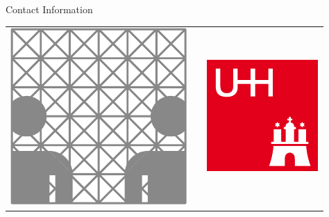 \documentclass[final]{beamer}
\newlength{\onecolwid}
\newlength{\twocolwid}
\begin{document}
\begin{frame}[t]
\begin{columns}[t]
\begin{column}{\twocolwid}
\begin{columns}[t,totalwidth=\twocolwid]
\begin{column}{\onecolwid}
\begin{block}{Contact Information}
		\end{block}


		\begin{center}
		\begin{tabular}{ccc}
		\includegraphics[width=0.4\linewidth]{src/infIcon.pdf} & \hfill & \includegraphics[width=0.4\linewidth]{src/uhhIconR.pdf}
		\end{tabular}
		\end{center}
		
	\end{column}
	
\end{columns}

\end{column}


	




\end{columns}
\end{frame}
\end{document}
